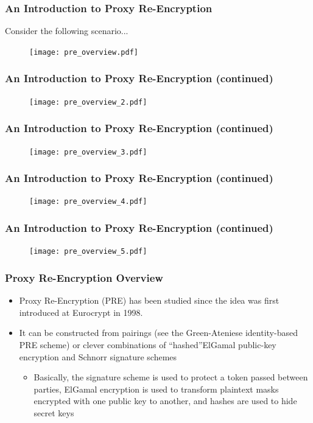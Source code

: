 \documentclass[handout]{beamer}
\begin{document}
\begin{frame}
	\frametitle{An Introduction to Proxy Re-Encryption}
	Consider the following scenario...
	\begin{figure}[h]
		\texttt{[image: pre\_overview.pdf]}
	\end{figure}
\end{frame}

\begin{frame}
	\frametitle{An Introduction to Proxy Re-Encryption (continued)}
	\begin{figure}[h]
		\texttt{[image: pre\_overview\_2.pdf]}
	\end{figure}
\end{frame}

\begin{frame}
	\frametitle{An Introduction to Proxy Re-Encryption (continued)}
	\begin{figure}[h]
		\texttt{[image: pre\_overview\_3.pdf]}
	\end{figure}
\end{frame}

\begin{frame}
	\frametitle{An Introduction to Proxy Re-Encryption (continued)}
	\begin{figure}[h]
		\texttt{[image: pre\_overview\_4.pdf]}
	\end{figure}
\end{frame}

\begin{frame}
	\frametitle{An Introduction to Proxy Re-Encryption (continued)}
	\begin{figure}[h]
		\texttt{[image: pre\_overview\_5.pdf]}
	\end{figure}
\end{frame}

\begin{frame}
	\frametitle{Proxy Re-Encryption Overview} 
	\begin{itemize}
		\item Proxy Re-Encryption (PRE) has been studied since the idea was first introduced at Eurocrypt in 1998.
		\item It can be constructed from pairings (see the Green-Ateniese identity-based PRE scheme) or clever combinations of ``hashed''ElGamal public-key encryption and Schnorr signature schemes
		\begin{itemize}
			\item Basically, the signature scheme is used to protect a token passed between parties, ElGamal encryption is used to transform plaintext masks encrypted with one public key to another, and hashes are used to hide secret keys
		\end{itemize}
	\end{itemize}
\end{frame}
\end{document}
